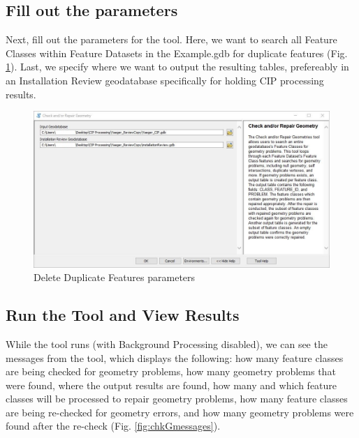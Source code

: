 \documentclass[openany]{book}
\theoremstyle{definition}
\theoremstyle{definition}
\theoremstyle{definition}
\theoremstyle{remark}
\begin{document}
\subsection{Fill out the parameters}\label{fill-out-the-parameters-4}

Next, fill out the parameters for the tool. Here, we want to search all
Feature Classes within Feature Datasets in the Example.gdb for duplicate
features (Fig. \ref{fig:chkGparams}). Last, we specify where we want to
output the resulting tables, prefereably in an Installation Review
geodatabase specifically for holding CIP processing results.\\

\begin{figure}[H]

{\centering \includegraphics{figures/chkG-params} 

}

\caption{Delete Duplicate Features parameters}\label{fig:chkGparams}
\end{figure}

\subsection{Run the Tool and View
Results}\label{run-the-tool-and-view-results-4}

While the tool runs (with Background Processing disabled), we can see
the messages from the tool, which displays the following: how many
feature classes are being checked for geometry problems, how many
geometry problems that were found, where the output results are found,
how many and which feature classes will be processed to repair geometry
problems, how many feature classes are being re-checked for geometry
errors, and how many geometry problems were found after the re-check
(Fig. \ref{fig:chkGmessages}).
\end{document}
